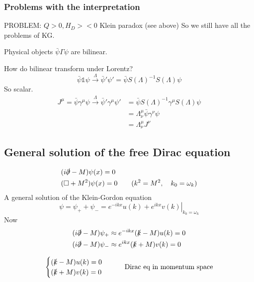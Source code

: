 \subsubsection{Problems with the interpretation}
PROBLEM: $Q > 0, H_D > < 0$
Klein paradox (see above)
So we still have all the problems of KG.

Physical objects  $\bar{\psi}\Gamma\psi$ are bilinear.

How do bilinear transform under Lorentz?
\[ \bar{\psi}\mathbb{1}\psi \overset{\Lambda}{\rightarrow} \bar{\psi}'\psi' = \bar{\psi}S(\Lambda)^{-1}S(\Lambda)\psi \]
So scalar.
\begin{align*}
J^\mu = \bar{\psi}\gamma^\mu \psi \overset{\Lambda}{\rightarrow} \bar{\psi}'\gamma^\mu\psi' &= \bar{\psi}S(\Lambda)^{-1}\gamma^\mu S(\Lambda)\psi \\
&= \Lambda^\mu_\nu \bar{\psi}\gamma^\nu\psi \\
&= \Lambda^\mu_\nu J^\nu
\end{align*}

\subsection{General solution of the free Dirac equation}
\begin{align*}
&(i\slashed{\partial}-M)\psi(x) = 0 \\
&(\Box + M^2)\psi(x) = 0 \qquad (k^2 = M^2, \quad k_0 = \omega_k)
\end{align*}
A general solution of the Klein-Gordon equation
\[ \psi = \psi_+ + \psi_- = \left.e^{-ikx}u(k) + e^{ikx}v(k)\right|_{k_0 = \omega_k} \]
Now
\begin{align*}
& (i\slashed{\partial} - M)\psi_+ \approx e^{-ikx}(\slashed{k}-M)u(k) = 0 \\
& (i\slashed{\partial} - M)\psi_- \approx e^{ikx}(\slashed{k}+M)v(k) = 0 
\end{align*}

\[ \begin{cases}
(\slashed{k}-M)u(k) = 0 \\
(\slashed{k}+M)v(k) = 0
\end{cases} \qquad \text{Dirac eq in momentum space}\]

